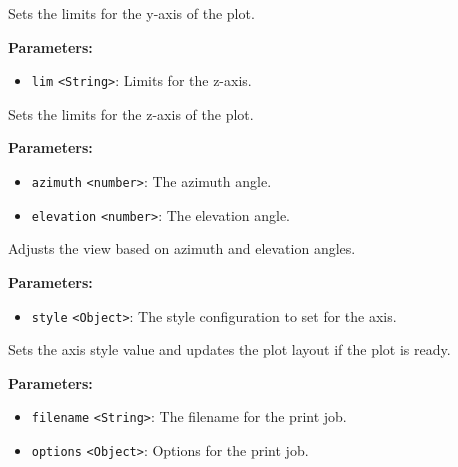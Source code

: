 \documentclass[12pt,a4paper]{article}
\begin{document}
\noindent Sets the limits for the y-axis of the plot.

\vspace{5mm}
\noindent {}


\noindent \textbf{Parameters:}
\begin{itemize}
  \item \texttt{lim} \texttt{<String>}: Limits for the z-axis.
\end{itemize}

\noindent Sets the limits for the z-axis of the plot.

\vspace{5mm}
\noindent {}


\noindent \textbf{Parameters:}
\begin{itemize}
  \item \texttt{azimuth} \texttt{<number>}: The azimuth angle.
  \item \texttt{elevation} \texttt{<number>}: The elevation angle.
\end{itemize}

\noindent Adjusts the view based on azimuth and elevation angles.

\vspace{5mm}
\noindent {}


\noindent \textbf{Parameters:}
\begin{itemize}
  \item \texttt{style} \texttt{<Object>}: The style configuration to set for the axis.
\end{itemize}

\noindent Sets the axis style value and updates the plot layout if the plot is ready.

\vspace{5mm}
\noindent {}


\noindent \textbf{Parameters:}
\begin{itemize}
  \item \texttt{filename} \texttt{<String>}: The filename for the print job.
  \item \texttt{options} \texttt{<Object>}: Options for the print job.
\end{itemize}
\end{document}
